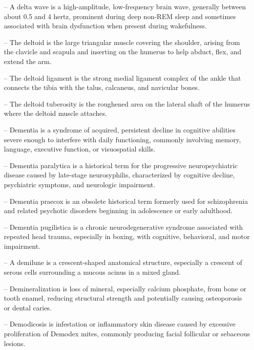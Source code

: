 -- A delta wave is a high-amplitude, low-frequency brain wave, generally between about 0.5 and 4 hertz, prominent during deep non-REM sleep and sometimes associated with brain dysfunction when present during wakefulness.

-- The deltoid is the large triangular muscle covering the shoulder, arising from the clavicle and scapula and inserting on the humerus to help abduct, flex, and extend the arm.

-- The deltoid ligament is the strong medial ligament complex of the ankle that connects the tibia with the talus, calcaneus, and navicular bones.

-- The deltoid tuberosity is the roughened area on the lateral shaft of the humerus where the deltoid muscle attaches.

-- Dementia is a syndrome of acquired, persistent decline in cognitive abilities severe enough to interfere with daily functioning, commonly involving memory, language, executive function, or visuospatial skills.

-- Dementia paralytica is a historical term for the progressive neuropsychiatric disease caused by late-stage neurosyphilis, characterized by cognitive decline, psychiatric symptoms, and neurologic impairment.

-- Dementia praecox is an obsolete historical term formerly used for schizophrenia and related psychotic disorders beginning in adolescence or early adulthood.

-- Dementia pugilistica is a chronic neurodegenerative syndrome associated with repeated head trauma, especially in boxing, with cognitive, behavioral, and motor impairment.

-- A demilune is a crescent-shaped anatomical structure, especially a crescent of serous cells surrounding a mucous acinus in a mixed gland.

-- Demineralization is loss of mineral, especially calcium phosphate, from bone or tooth enamel, reducing structural strength and potentially causing osteoporosis or dental caries.

-- Demodicosis is infestation or inflammatory skin disease caused by excessive proliferation of Demodex mites, commonly producing facial follicular or sebaceous lesions.


